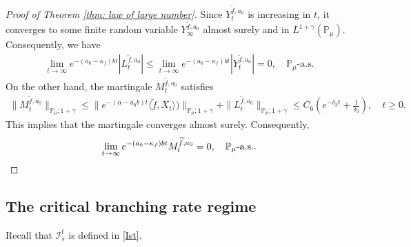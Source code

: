 \documentclass[12pt,a4paper]{amsart}
\theoremstyle{plain}
\theoremstyle{definition}
\numberwithin{equation}{section}
\begin{document}
\begin{proof}[Proof of Theorem \ref{thm: law of large number}]
    Since $Y_t^{\widetilde{f},a_0}$ is increasing in $t$, it converges to some finite random variable $Y_{\infty}^{\widetilde{f},a_0}$ almost surely and in $L^{1+\gamma}(\mathbb{P}_{\mu})$.
Consequently,  we have
\begin{align}
    \lim_{t\rightarrow \infty}e^{-(a_0 - \kappa_f)bt}|L_t^{\widetilde{f},a_0}|
    \leq  \lim_{t\rightarrow \infty}e^{-(a_0 - \kappa_f)bt}|Y_t^{\widetilde{f},a_0}|=0, \quad
     \mathbb P_\mu\text{-a.s.}
\end{align}
	On the other hand, the martingale $M_t^{\widetilde{f},a_0}$ satisfies
\begin{align}
    \|M_t^{\widetilde{f},a_0}\|_{\mathbb{P}_{\mu};1+\gamma}
    \leq  \|e^{-(\alpha-a_0 b)t}\langle \widetilde{f},X_t\rangle)\|_{\mathbb{P}_{\mu};1+\gamma}+\|L_t^{\widetilde{f},a_0}\|_{\mathbb{P}_{\mu};1+\gamma}
    \leq C_6(e^{-\delta_3 t}+\frac{1}{\delta_3}),
    \quad t\geq 0.
\end{align}
	This implies that the martingale converges almost surely.
	Consequently,
\[
	\lim_{t\rightarrow\infty} e^{-(a_0-\kappa_f)bt}M_t^{\widetilde{f},a_0}
	=0,
	\quad \mathbb P_\mu\text{-a.s.}.
    \qedhere
\]
\end{proof}

\subsection{The critical branching rate regime}
\label{sec:critical}

    Recall that $\mathcal I_s^t$ is defined in \eqref{Ist}.
\end{document}

